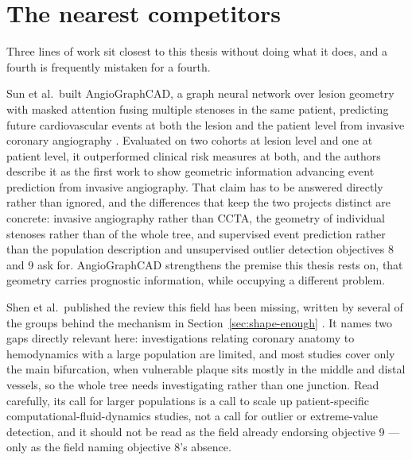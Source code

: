 %

\section{The nearest competitors}
\label{sec:nearest-competitors}

Three lines of work sit closest to this thesis without doing what it does, and a fourth is
frequently mistaken for a fourth.

Sun et al.\ built AngioGraphCAD, a graph neural network over lesion geometry with masked attention
fusing multiple stenoses in the same patient, predicting future cardiovascular events at both the
lesion and the patient level from invasive coronary angiography \cite{sun2026angiographcad}.
Evaluated on two cohorts at lesion level and one at patient level, it outperformed clinical risk
measures at both, and the authors describe it as the first work to show geometric information
advancing event prediction from invasive angiography.
That claim has to be answered directly rather than ignored, and the differences that keep the two
projects distinct are concrete: invasive angiography rather than CCTA, the geometry of individual
stenoses rather than of the whole tree, and supervised event prediction rather than the population
description and unsupervised outlier detection objectives 8 and 9 ask for.
AngioGraphCAD strengthens the premise this thesis rests on, that geometry carries prognostic
information, while occupying a different problem.

Shen et al.\ published the review this field has been missing, written by several of the groups
behind the mechanism in Section~\ref{sec:shape-enough} \cite{shen2026geometry}.
It names two gaps directly relevant here: investigations relating coronary anatomy to hemodynamics
with a large population are limited, and most studies cover only the main bifurcation, when
vulnerable plaque sits mostly in the middle and distal vessels, so the whole tree needs investigating
rather than one junction.
Read carefully, its call for larger populations is a call to scale up patient-specific
computational-fluid-dynamics studies, not a call for outlier or extreme-value detection, and it
should not be read as the field already endorsing objective 9 --- only as the field naming objective
8's absence.

